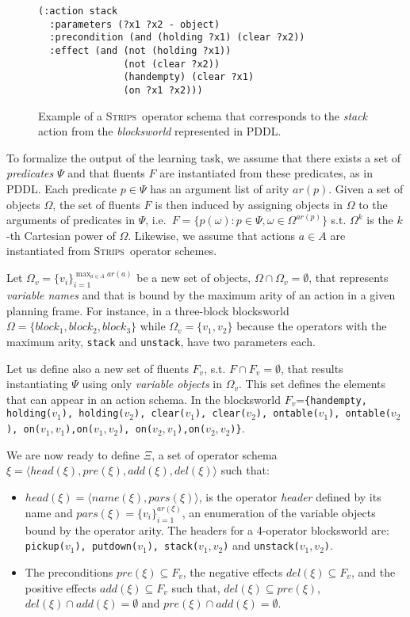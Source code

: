 \documentclass[letterpaper]{article} %
\newcommand{\tup}[1]{{\langle #1 \rangle}}
\newcommand{\strips}{\textsc{Strips}}     %
\begin{document}
\begin{figure}
\begin{footnotesize}
\begin{verbatim}
(:action stack
  :parameters (?x1 ?x2 - object)
  :precondition (and (holding ?x1) (clear ?x2))
  :effect (and (not (holding ?x1)) 
               (not (clear ?x2))
               (handempty) (clear ?x1) 
               (on ?x1 ?x2)))
\end{verbatim}
\end{footnotesize}
 \caption{\small Example of a \strips\ operator schema that corresponds to the {\em stack} action from the {\em blocksworld} represented in PDDL.}
\label{fig:stack}
\end{figure}

To formalize the output of the learning task, we assume that there exists a set of {\em predicates} $\Psi$ and that fluents $F$ are instantiated from these predicates, as in PDDL. Each predicate $p\in\Psi$ has an argument list of arity $ar(p)$. Given a set of objects $\Omega$, the set of fluents $F$ is then induced by assigning objects in $\Omega$ to the arguments of predicates in $\Psi$, i.e.~$F=\{p(\omega):p\in\Psi,\omega\in\Omega^{ar(p)}\}$ s.t. $\Omega^k$ is the $k$-th Cartesian power of $\Omega$. Likewise, we assume that actions $a\in A$ are instantiated from \strips\ operator schemes. 

Let $\Omega_v=\{v_i\}_{i=1}^{\operatorname*{max}_{a\in A} ar(a)}$ be a new set of objects, $\Omega\cap\Omega_v=\emptyset$, that represents {\em variable names} and that is bound by the maximum arity of an action in a given planning frame. For instance, in a three-block blocksworld $\Omega=\{block_1, block_2, block_3\}$ while $\Omega_v=\{v_1, v_2\}$ because the operators with the maximum arity, {\small\tt stack} and {\small\tt unstack}, have two parameters each.

Let us define also a new set of fluents $F_{v}$, s.t. $F\cap F_v=\emptyset$, that results instantiating $\Psi$ using only {\em variable objects} in $\Omega_v$. This set defines the elements that can appear in an action schema. In the blocksworld $F_v$={\small\tt\{handempty, holding($v_1$), holding($v_2$), clear($v_1$), clear($v_2$), ontable($v_1$), ontable($v_2$), on($v_1,v_1$),on($v_1,v_2$), on($v_2,v_1$),on($v_2,v_2$)\}}. 

We are now ready to define $\Xi$, a set of operator schema $\xi=\tup{head(\xi),pre(\xi),add(\xi),del(\xi)}$ such that:
\begin{itemize}
\item $head(\xi)=\tup{name(\xi),pars(\xi)}$, is the operator {\em header} defined by its name and $pars(\xi)=\{v_i\}_{i=1}^{ar(\xi)}$, an enumeration of the variable objects bound by the operator arity. The headers for a 4-operator blocksworld are: {\small\tt pickup($v_1$), putdown($v_1$), stack($v_1,v_2$)} and {\small\tt unstack($v_1,v_2$)}.
\item The preconditions $pre(\xi)\subseteq F_v$, the negative effects $del(\xi)\subseteq F_v$, and the positive effects $add(\xi)\subseteq F_v$ such that, $del(\xi)\subseteq pre(\xi)$, $del(\xi)\cap add(\xi)=\emptyset$ and $pre(\xi)\cap add(\xi)=\emptyset$.
\end{itemize}
\end{document}
